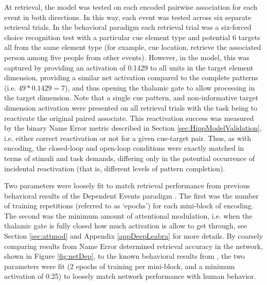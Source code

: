 \documentclass[11pt, titlepage, twoside]{article}
\begin{document}
At retrieval, the model was tested on each encoded pairwise association for each event in both directions.  In this way, each event was tested across six separate retrieval trials.  In the behavioral paradigm each retrieval trial was a six-forced choice recognition test with a particular cue element type and potential 6 targets all from the same element type (for example, cue location, retrieve the associated person among five people from other events).  However, in the model, this was captured by providing an activation of 0.1429 to all units in the target element dimension, providing a similar net activation compared to the complete patterns (i.e. $49 * 0.1429=7$), and thus opening the thalamic gate to allow processing in the target dimension. Note that a single cue pattern, and non-informative target dimension activation were presented on all retrieval trials with the task being to reactivate the original paired associate.  This reactivation success was measured by the binary Name Error metric described in Section \ref{sec:HippModelValidation}, i.e. either correct reactivation or not for a given cue-target pair. Thus, as with encoding, the closed-loop and open-loop conditions were exactly matched in terms of stimuli and task demands, differing only in the potential occurrence of incidental reactivation (that is, different levels of pattern completion).  

Two parameters were loosely fit to match retrieval performance from previous behavioral results of the Dependent Events paradigm \cite{HornerBisbyBushEtAl15,HornerBurgess14}.  The first was the number of training repetitions (referred to as `epochs') for each mini-block of encoding.  The second was the minimum amount of attentional modulation, i.e. when the thalamic gate is fully closed how much activation is allow to get through, see Section \ref{sec:attmod} and Appendix \ref{appDeepLeabra} for more details.  By coarsely comparing results from Name Error determined retrieval accuracy in the network, shown in Figure \ref{fig:netDep}, to the known behavioral results from \textcite{HornerBisbyBushEtAl15,HornerBurgess14}, the two parameters were fit (2 epochs of training per mini-block, and a minimum activation of 0.25) to loosely match network performance with human behavior.
\end{document}
